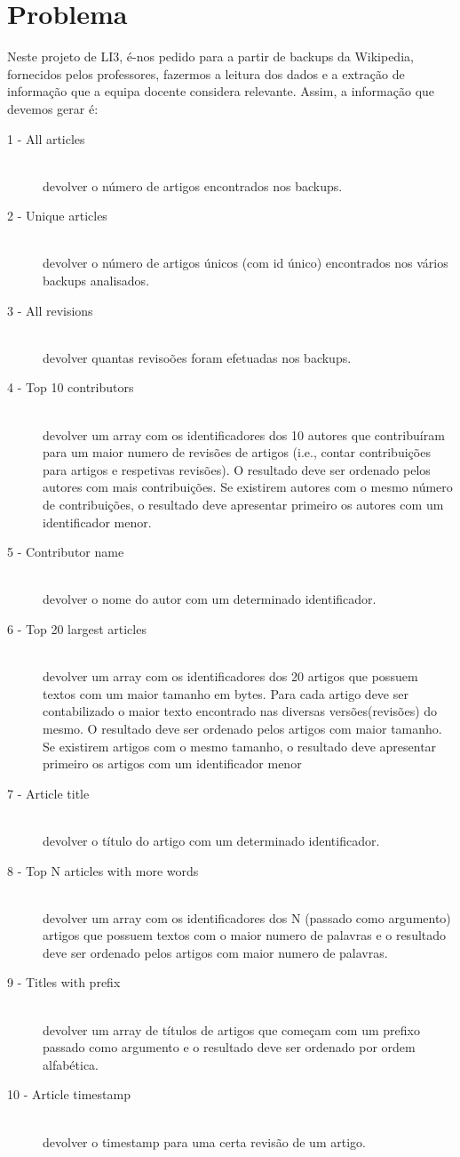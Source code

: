 \documentclass[a4paper]{article}
\begin{document}
\section{Problema}
\label{sec:problema}
Neste projeto de LI3, é-nos pedido para a partir de backups da Wikipedia, fornecidos pelos professores, fazermos a leitura dos dados e a extração de informação que a equipa docente considera relevante. Assim, a informação que devemos gerar é:
\begin{description}
\item[1 - All articles]\hfill \\
devolver o número de artigos encontrados nos backups.
\item[2 - Unique articles]\hfill \\
devolver o número de artigos únicos (com id único) encontrados nos vários backups analisados.
\item[3 - All revisions]\hfill \\
devolver quantas revisoões foram efetuadas nos backups.
\item[4 - Top 10 contributors]\hfill \\
devolver um array com os identificadores dos 10 autores que contribuíram para um maior numero de revisões de artigos (i.e., contar contribuições para artigos e respetivas revisões). O resultado deve ser ordenado pelos autores com mais contribuições. Se existirem autores com o mesmo número de contribuições, o resultado deve apresentar primeiro os autores com um identificador menor.
\item[5 - Contributor name]\hfill \\
devolver o nome do autor com um determinado identificador.
\item[6 - Top 20 largest articles]\hfill \\
devolver um array com os identificadores dos 20 artigos que possuem textos com um maior tamanho em bytes. Para cada artigo deve ser contabilizado o maior texto encontrado nas diversas versões(revisões) do mesmo. O resultado deve ser ordenado pelos artigos com maior tamanho. Se existirem artigos com o mesmo tamanho, o resultado deve apresentar primeiro os artigos com um identificador menor
\item[7 - Article title]\hfill \\
devolver o título do artigo com um determinado identificador.
\item[8 - Top N articles with more words]\hfill \\
devolver um array com os identificadores dos N (passado como argumento) artigos que possuem textos com o maior numero de palavras e o resultado deve ser ordenado pelos artigos com maior numero de palavras.
\item[9 - Titles with prefix]\hfill \\
devolver um array de títulos de artigos que começam com um prefixo passado como argumento e o resultado deve ser ordenado por ordem alfabética.
\item[10 - Article timestamp]\hfill \\
devolver o timestamp para uma certa revisão de um artigo.
\end{description}
\end{document}
